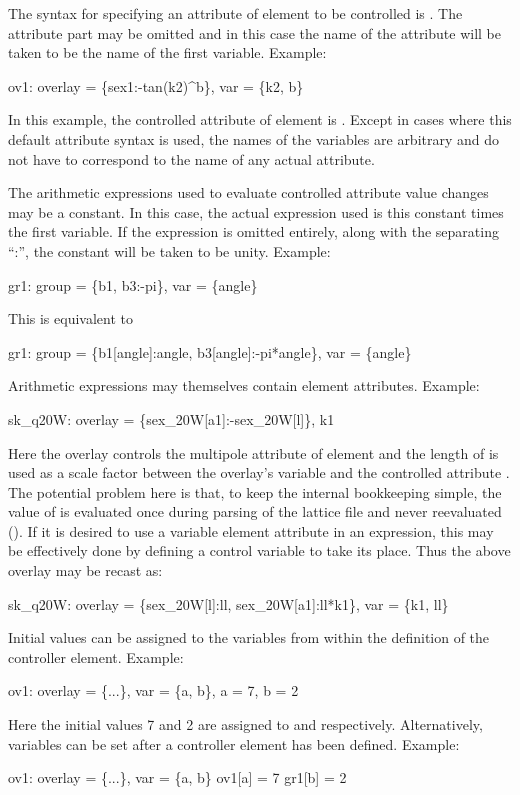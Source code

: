 The syntax for specifying an attribute  of element 
to be controlled is . The attribute part \vn{[attrib]}
may be omitted and in this case the name of the attribute will be
taken to be the name of the first variable. Example:
\begin{example}
  ov1: overlay = \{sex1:-tan(k2)^b\}, var = \{k2, b\}
\end{example}
In this example, the controlled attribute of element  is
.  Except in cases where this default attribute syntax is used,
the names of the variables are arbitrary and do not have to correspond
to the name of any actual attribute.

The arithmetic expressions used to evaluate controlled attribute value
changes may be a constant. In this case, the actual expression used is
this constant times the first variable. If the expression is omitted
entirely, along with the separating ``:'', the constant will be taken
to be unity. Example:
\begin{example}
  gr1: group = \{b1, b3:-pi\}, var = \{angle\}
\end{example}
This is equivalent to
\begin{example}
  gr1: group = \{b1[angle]:angle, b3[angle]:-pi*angle\}, var = \{angle\}
\end{example}

Arithmetic expressions may themselves contain element attributes.
Example:
\begin{example}
  sk_q20W: overlay = \{sex_20W[a1]:-sex_20W[l]\}, k1
\end{example}
Here the  overlay controls the  multipole attribute of element
 and the length of  is used as a scale factor between the
overlay's variable  and the controlled attribute . The potential problem
here is that, to keep the internal bookkeeping simple, the value of  is
evaluated once during parsing of the lattice file and never reevaluated ().
If it is desired to use a variable element attribute in an expression, this may be
effectively done by defining a control variable to take its place. Thus the above overlay
may be recast as:
\begin{example}
  sk_q20W: overlay = \{sex_20W[l]:ll, sex_20W[a1]:ll*k1\}, var = \{k1, ll\}
\end{example}

Initial values can be assigned to the variables from within the
definition of the controller element. Example:
\begin{example}
  ov1: overlay = \{...\}, var = \{a, b\}, a = 7, b = 2
\end{example}
Here the initial values 7 and 2 are assigned to  and  respectively.
Alternatively, variables can be set after a controller element has been defined. 
Example:
\begin{example}
  ov1: overlay = \{...\}, var = \{a, b\}
  ov1[a] = 7
  gr1[b] = 2
\end{example}

